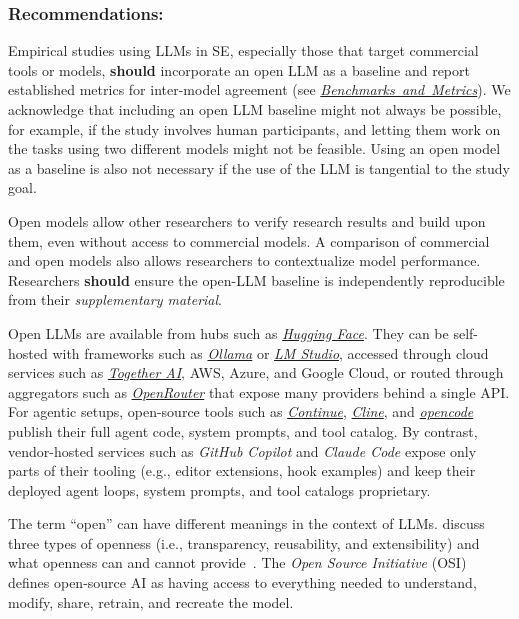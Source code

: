 \documentclass[smallextended]{svjour3}
\newcommand{\should}{\textbf{should}\xspace}
\newcommand{\supplementarymaterial}{\emph{supplementary material}\xspace}
\newcommand{\supplementarymaterial}{\emph{supplementary material}\xspace}
\newcommand{\benchmarksmetrics}{\hyperref[sec:use-suitable-baselines-benchmarks-and-metrics]{\mbox{\emph{Benchmarks and Metrics}}}\xspace}
\newcommand{\benchmarksmetrics}{\href{/guidelines/benchmarks-metrics/}{\emph{Benchmarks and Metrics}}\xspace}
\newcommand{\guidelinesubsubsection}[1]{\subsubsection{\bfseries #1:}}
\newcommand{\guidelinesubsubsection}[1]{\subsubsection{#1}}
\begin{document}
\guidelinesubsubsection{Recommendations}

Empirical studies using LLMs in SE, especially those that target commercial tools or models, \should incorporate an open LLM as a baseline and report established metrics for inter-model agreement (see \benchmarksmetrics).
We acknowledge that including an open LLM baseline might not always be possible, for example, if the study involves human participants, and letting them work on the tasks using two different models might not be feasible.
Using an open model as a baseline is also not necessary if the use of the LLM is tangential to the study goal.

Open models allow other researchers to verify research results and build upon them, even without access to commercial models.
A comparison of commercial and open models also allows researchers to contextualize model performance.
Researchers \should ensure the open-LLM baseline is independently reproducible from their \supplementarymaterial.

Open LLMs are available from hubs such as \href{https://huggingface.co/}{\emph{Hugging Face}}. They can be self-hosted with frameworks such as \href{https://ollama.com/}{\emph{Ollama}} or \href{https://lmstudio.ai/}{\emph{LM Studio}}, accessed through cloud services such as \href{https://together.ai/}{\emph{Together AI}}, AWS, Azure, and Google Cloud, or routed through aggregators such as \href{https://openrouter.ai/}{\emph{OpenRouter}} that expose many providers behind a single API. For agentic setups, open-source tools such as \href{https://www.continue.dev/}{\emph{Continue}}, \href{https://cline.bot/}{\emph{Cline}}, and \href{https://opencode.ai/}{\emph{opencode}}~\cite{opencode} publish their full agent code, system prompts, and tool catalog. By contrast, vendor-hosted services such as \emph{GitHub Copilot} and \emph{Claude Code} expose only parts of their tooling (e.g., editor extensions, hook examples) and keep their deployed agent loops, system prompts, and tool catalogs proprietary.

The term ``open'' can have different meanings in the context of LLMs.
\citeauthor{widder2024open} discuss three types of openness (i.e., transparency, reusability, and extensibility) and what openness can and cannot provide~\cite{widder2024open}.
The \emph{Open Source Initiative} (OSI)~\cite{OSIAI2024} defines open-source AI as having access to everything needed to understand, modify, share, retrain, and recreate the model.
\end{document}
